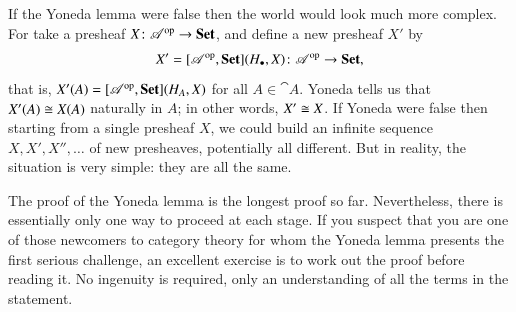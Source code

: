 If the Yoneda lemma were false then the world would look much more complex.
For take a presheaf $X\from \cat{A}^\op \to \Set$, and define a new
presheaf $X'$ by
\[
X' = \pshf{\cat{A}}(\h_\bl, X)
\from
\cat{A}^\op \to \Set,
\]
that is, $X'(A) = [\mathscr{A}^{\mathrm{op}},\mathbf{Set}](H_A, X)$ for all $A \in \cat{A}$.  Yoneda
tells us that $X'(A) \cong X(A)$ naturally in $A$; in other words, $X' \cong
X$.  If Yoneda were false then starting from a single presheaf $X$, we
could build an infinite sequence $X, X', X'', \ldots$ of new presheaves,
potentially all different.  But in reality, the situation is very simple:
they are all the same.

The proof of the Yoneda lemma is the longest proof so far.  Nevertheless,
there is essentially only one way to proceed at each stage.  If you suspect
that you are one of those newcomers to category theory for whom the Yoneda
lemma presents the first serious challenge, an excellent exercise is to
work out the proof before reading it.  No ingenuity is required, only an
understanding of all the terms in the statement.

